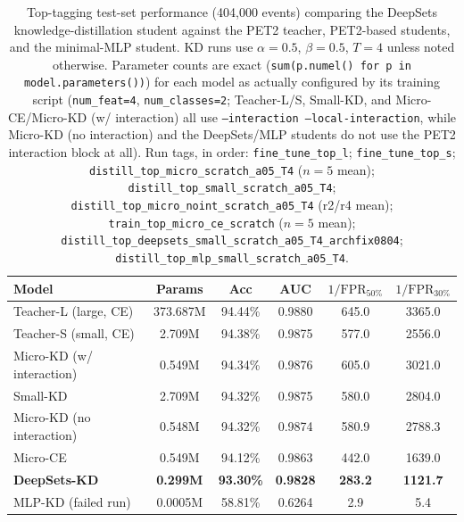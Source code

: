 \begin{table}[h]
    \centering
    \small
    \begin{tabular}{lccccc}
        \toprule
        Model & Params & Acc & AUC & $1/\mathrm{FPR}_{50\%}$ & $1/\mathrm{FPR}_{30\%}$ \\
        \midrule
        Teacher-L (large, CE)             & 373.687M & 94.44\% & 0.9880 & 645.0 & 3365.0 \\
        Teacher-S (small, CE)             & 2.709M & 94.38\% & 0.9875 & 577.0 & 2556.0 \\
        Micro-KD (w/ interaction)         & 0.549M & 94.34\% & 0.9876 & 605.0 & 3021.0 \\
        Small-KD                          & 2.709M & 94.32\% & 0.9875 & 580.0 & 2804.0 \\
        Micro-KD (no interaction)         & 0.548M & 94.32\% & 0.9874 & 580.9 & 2788.3 \\
        Micro-CE                          & 0.549M & 94.12\% & 0.9863 & 442.0 & 1639.0 \\
        \textbf{DeepSets-KD}              & \textbf{0.299M} & \textbf{93.30\%} & \textbf{0.9828} & \textbf{283.2} & \textbf{1121.7} \\
        MLP-KD (failed run)               & 0.0005M & 58.81\% & 0.6264 & 2.9 & 5.4 \\
        \bottomrule
    \end{tabular}
    \caption{Top-tagging test-set performance (404{,}000 events) comparing the
    DeepSets knowledge-distillation student against the PET2 teacher, PET2-based
    students, and the minimal-MLP student. KD runs use $\alpha=0.5$,
    $\beta=0.5$, $T=4$ unless noted otherwise. Parameter counts are exact
    (\texttt{sum(p.numel() for p in model.parameters())}) for each model as
    actually configured by its training script (\texttt{num\_feat=4},
    \texttt{num\_classes=2}; Teacher-L/S, Small-KD, and Micro-CE/Micro-KD
    (w/ interaction) all use \texttt{--interaction --local-interaction}, while
    Micro-KD (no interaction) and the DeepSets/MLP students do not use the
    PET2 interaction block at all). Run tags, in order:
    \texttt{fine\_tune\_top\_l}; \texttt{fine\_tune\_top\_s};
    \texttt{distill\_top\_micro\_scratch\_a05\_T4} ($n{=}5$ mean);
    \texttt{distill\_top\_small\_scratch\_a05\_T4};
    \texttt{distill\_top\_micro\_noint\_scratch\_a05\_T4} (r2/r4 mean);
    \texttt{train\_top\_micro\_ce\_scratch} ($n{=}5$ mean);
    \texttt{distill\_top\_deepsets\_small\_scratch\_a05\_T4\_archfix0804};
    \texttt{distill\_top\_mlp\_small\_scratch\_a05\_T4}.}
    \label{tab:deepsets-mlp-comparison}
\end{table}


